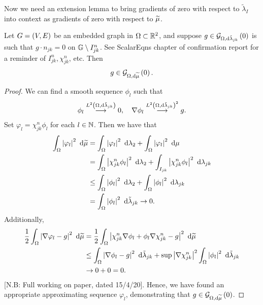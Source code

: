 \documentclass[11pt]{report}
\newcommand{\tlambda}{\tilde{\lambda}}
\begin{document}
Now we need an extension lemma to bring gradients of zero with respect to $\tlambda_I$ into context as gradients of zero with respect to $\widetilde{\mu}$.
\begin{lemma} \label{lem:ExtLemmaGradZeroCompositeMeasure}
	Let $G=\left( V,E \right)$ be an embedded graph in $\Omega\subset\mathbb{R}^2$, and suppose $g\in\gradZero{\ddom}{\tlambda_{jk}}$ is such that $g\cdot n_{jk}=0$ on $\mathbb{G}\setminus I^n_{jk}$.
	See ScalarEqns chapter of confirmation report for a reminder of $I^n_{jk}, \chi^n_{jk}$, etc.
	Then
	\begin{align*}
		g\in\mathcal{G}_{ \Omega, \mathrm{d}\widetilde{\mu}}\left( 0 \right).
	\end{align*}
\end{lemma}
\begin{proof}
	We can find a smooth sequence $\phi_l$ such that
	\begin{align*}
		\phi_l \lconv{\ltwo{\ddom}{\tlambda_{jk}}} 0, \quad
		\grad\phi_l \lconv{\ltwo{\ddom}{\tlambda_{jk}}^2} g.
	\end{align*}
	Set $\varphi_l = \chi^n_{jk}\phi_l$ for each $l\in\mathbb{N}$.
	Then we have that
	\begin{align*}
		\integral{\ddom}{\abs{\varphi_l}^2}{\dddmes}
		&= \integral{\ddom}{\abs{\varphi_l}^2}{\lambda_2} + \integral{\ddom}{\abs{\varphi_l}^2}{\ddmes} \\
		&= \integral{\ddom}{\abs{\chi^n_{jk}\phi_l}^2}{\lambda_2} + \integral{I_{jk}}{\abs{\chi^n_{jk}\phi_l}^2}{\lambda_{jk}} \\
		&\leq \integral{\ddom}{\abs{\phi_l}^2}{\lambda_2} + \integral{\ddom}{\abs{\phi_l}^2}{\lambda_{jk}} \\
		&= \integral{\ddom}{\abs{\phi_l}^2}{\tlambda_{jk}} \rightarrow 0.
	\end{align*}
	Additionally,
	\begin{align*}
		\recip{2}\integral{\ddom}{\abs{\grad\varphi_l - g}^2}{\dddmes}
		&= \recip{2}\integral{\ddom}{\abs{\chi^n_{jk}\grad\phi_l + \phi_l\grad\chi^n_{jk} - g}^2}{\dddmes} \\
		&\leq \integral{\ddom}{\abs{\grad\phi_l - g}^2}{\tlambda_{jk}} + \sup\abs{\grad\chi^n_{jk}}^2\integral{\ddom}{\abs{\phi_l}^2}{\tlambda_{jk}} \\
		&\rightarrow 0+0 = 0.
	\end{align*}
	[N.B: Full working on paper, dated 15/4/20].
	Hence, we have found an appropriate approximating sequence $\varphi_l$, demonstrating that $g\in\mathcal{G}_{ \Omega, \mathrm{d}\widetilde{\mu}}\left( 0 \right)$.
\end{proof}	
\end{document}
